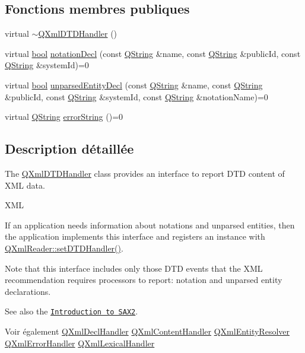 \subsection*{Fonctions membres publiques}
\begin{DoxyCompactItemize}
\item 
virtual \hyperlink{class_q_xml_d_t_d_handler_ac02525383ad3dc13b027ddd6718b2325}{$\sim$\+Q\+Xml\+D\+T\+D\+Handler} ()
\item 
virtual \hyperlink{qglobal_8h_a1062901a7428fdd9c7f180f5e01ea056}{bool} \hyperlink{class_q_xml_d_t_d_handler_a3ce7216b7646cd26bd11c4bdee883507}{notation\+Decl} (const \hyperlink{class_q_string}{Q\+String} \&name, const \hyperlink{class_q_string}{Q\+String} \&public\+Id, const \hyperlink{class_q_string}{Q\+String} \&system\+Id)=0
\item 
virtual \hyperlink{qglobal_8h_a1062901a7428fdd9c7f180f5e01ea056}{bool} \hyperlink{class_q_xml_d_t_d_handler_a956c5143b8f349a19782fb56c577e04e}{unparsed\+Entity\+Decl} (const \hyperlink{class_q_string}{Q\+String} \&name, const \hyperlink{class_q_string}{Q\+String} \&public\+Id, const \hyperlink{class_q_string}{Q\+String} \&system\+Id, const \hyperlink{class_q_string}{Q\+String} \&notation\+Name)=0
\item 
virtual \hyperlink{class_q_string}{Q\+String} \hyperlink{class_q_xml_d_t_d_handler_a40f40b9674be96a009a93147d5e0178d}{error\+String} ()=0
\end{DoxyCompactItemize}


\subsection{Description détaillée}
The \hyperlink{class_q_xml_d_t_d_handler}{Q\+Xml\+D\+T\+D\+Handler} class provides an interface to report D\+T\+D content of X\+M\+L data. 

X\+M\+L

If an application needs information about notations and unparsed entities, then the application implements this interface and registers an instance with \hyperlink{class_q_xml_reader_a0b24b1fe26a4c32a8032d68ee14d5dba}{Q\+Xml\+Reader\+::set\+D\+T\+D\+Handler()}.

Note that this interface includes only those D\+T\+D events that the X\+M\+L recommendation requires processors to report\+: notation and unparsed entity declarations.

See also the \href{xml.html#introSAX2}{\tt Introduction to S\+A\+X2}.

\begin{DoxySeeAlso}{Voir également}
\hyperlink{class_q_xml_decl_handler}{Q\+Xml\+Decl\+Handler} \hyperlink{class_q_xml_content_handler}{Q\+Xml\+Content\+Handler} \hyperlink{class_q_xml_entity_resolver}{Q\+Xml\+Entity\+Resolver} \hyperlink{class_q_xml_error_handler}{Q\+Xml\+Error\+Handler} \hyperlink{class_q_xml_lexical_handler}{Q\+Xml\+Lexical\+Handler} 
\end{DoxySeeAlso}


